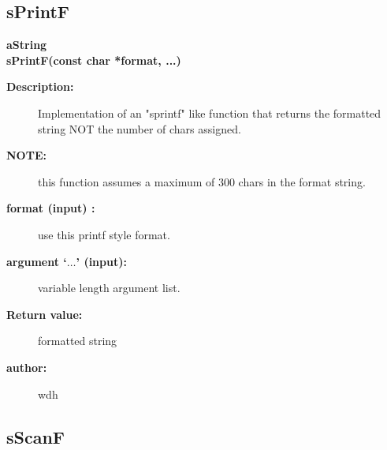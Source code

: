 \subsection{sPrintF}
 
\newlength{\otherStuffIncludeArgIndent}
\begin{flushleft} \textbf{%
aString  \\ 
\settowidth{\otherStuffIncludeArgIndent}{sPrintF(}%
sPrintF(const char *format, ...)
}\end{flushleft}
\begin{description}
\item[{\bf Description:}] 
 Implementation of an "sprintf" like function that returns the formatted 
  string NOT the number of chars assigned.
  
\item[{\bf NOTE:}]  this function assumes a maximum of 300 chars in the format string.

\item[{\bf format (input) :}]  use this printf style format.
\item[{\bf argument `$\ldots$' (input):}]  variable length argument list.
\item[{\bf Return value:}]  formatted string
 
\item[{\bf author:}]  wdh
\end{description}
\subsection{sScanF}
 
